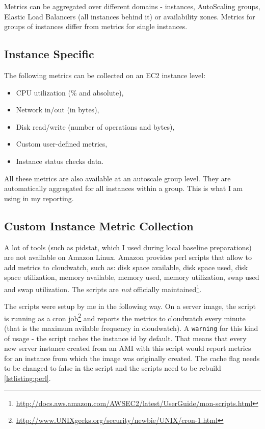 \documentclass{uvamscse}
\begin{document}
Metrics can be aggregated over different domains - instances, AutoScaling groups, Elastic Load Balancers (all instances behind it) or availability zones. Metrics for groups of instances differ from metrics for single instances.

\subsection{Instance Specific}
The following metrics can be collected on an EC2 instance level:
\begin{itemize}
  \item CPU utilization (\% and absolute),
  \item Network in/out (in bytes),
  \item Disk read/write (number of operations and bytes),
  \item Custom user-defined metrics,
  \item Instance status checks data.
\end{itemize}

All these metrics are also available at an autoscale group level. They are automatically aggregated for all instances within a group. This is what I am using in my reporting.

\subsection{Custom Instance Metric Collection} \label{Custom Metric Collection}
A lot of tools (such as pidstat, which I used during local baseline preparations) are not available on Amazon Linux. Amazon provides perl scripts that allow to add metrics to cloudwatch, such as: disk space available, disk space used, disk space utilization, memory available, memory used, memory utilization, swap used and swap utilization. The scripts are \textit{not} officially maintained\footnote{\url{http://docs.aws.amazon.com/AWSEC2/latest/UserGuide/mon-scripts.html}}.

The scripts were setup by me in the following way. On a server image, the script is running as a cron job\footnote{\url{http://www.UNIXgeeks.org/security/newbie/UNIX/cron-1.html}} and reports the metrics to cloudwatch every minute (that is the maximum avilable frequency in cloudwatch). A \texttt{warning} for this kind of usage - the script caches the instance id by default. That means that every new server instance created from an AMI with this script would report metrics for an instance from which the image was originally created. The cache flag needs to be changed to false in the script and the scripts need to be rebuild \ref{lstlisting:perl}.
\end{document}
